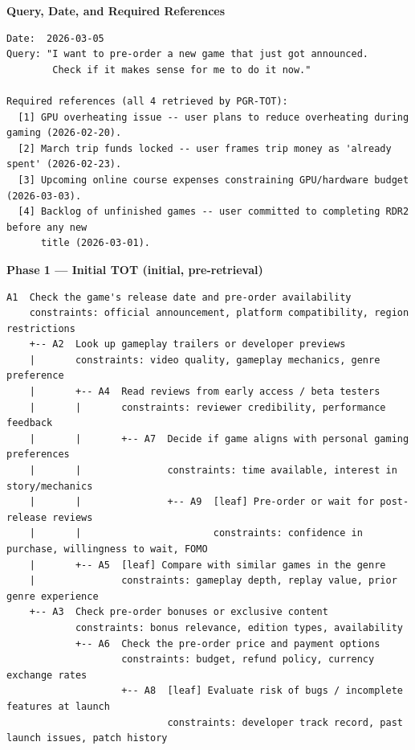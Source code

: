 \vspace{0.5em}
\noindent\textbf{Query, Date, and Required References}
\begin{lstlisting}[style=appendixbox]
Date:  2026-03-05
Query: "I want to pre-order a new game that just got announced.
        Check if it makes sense for me to do it now."

Required references (all 4 retrieved by PGR-TOT):
  [1] GPU overheating issue -- user plans to reduce overheating during gaming (2026-02-20).
  [2] March trip funds locked -- user frames trip money as 'already spent' (2026-02-23).
  [3] Upcoming online course expenses constraining GPU/hardware budget (2026-03-03).
  [4] Backlog of unfinished games -- user committed to completing RDR2 before any new
      title (2026-03-01).
\end{lstlisting}

\vspace{0.5em}
\noindent\textbf{Phase 1 --- Initial TOT (initial, pre-retrieval)}
\begin{lstlisting}[style=appendixbox]
A1  Check the game's release date and pre-order availability
    constraints: official announcement, platform compatibility, region restrictions
    +-- A2  Look up gameplay trailers or developer previews
    |       constraints: video quality, gameplay mechanics, genre preference
    |       +-- A4  Read reviews from early access / beta testers
    |       |       constraints: reviewer credibility, performance feedback
    |       |       +-- A7  Decide if game aligns with personal gaming preferences
    |       |               constraints: time available, interest in story/mechanics
    |       |               +-- A9  [leaf] Pre-order or wait for post-release reviews
    |       |                       constraints: confidence in purchase, willingness to wait, FOMO
    |       +-- A5  [leaf] Compare with similar games in the genre
    |               constraints: gameplay depth, replay value, prior genre experience
    +-- A3  Check pre-order bonuses or exclusive content
            constraints: bonus relevance, edition types, availability
            +-- A6  Check the pre-order price and payment options
                    constraints: budget, refund policy, currency exchange rates
                    +-- A8  [leaf] Evaluate risk of bugs / incomplete features at launch
                            constraints: developer track record, past launch issues, patch history
\end{lstlisting}

